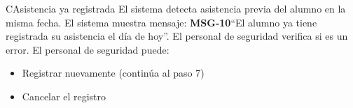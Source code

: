 \begin{UCtrayectoriaA}{C}{Asistencia ya registrada}
	\UCpaso El sistema detecta asistencia previa del alumno en la misma fecha.
	\UCpaso El sistema muestra mensaje: {\bf MSG-10}{``El alumno ya tiene registrada su asistencia el día de hoy''}.
	\UCpaso[\UCactor] El personal de seguridad verifica si es un error.
	\UCpaso[\UCactor] El personal de seguridad puede:
	\begin{itemize}
		\item Registrar nuevamente (continúa al paso 7)
		\item Cancelar el registro
	\end{itemize}
\end{UCtrayectoriaA}

